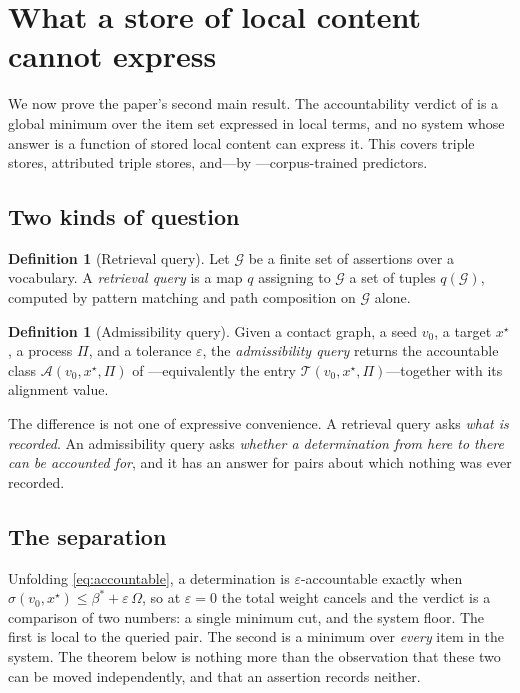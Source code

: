 \documentclass[11pt,twocolumn,a4paper]{article}
\theoremstyle{dirthm}
\theoremstyle{definition}
\newtheorem{definition}[theorem]{Definition}
\theoremstyle{remark}
\newcommand{\flo}{\beta}
\newcommand{\str}{\sigma}
\newcommand{\Om}{\Omega}
\newcommand{\Proc}{\Pi}
\newcommand{\Tab}{\mathcal{T}}
\newcommand{\acc}{\mathcal{A}}
\newcommand{\eps}{\varepsilon}
\begin{document}
\section{What a store of local content cannot express}
\label{sec:separation}

We now prove the paper's second main result. The accountability verdict of
 is a global minimum over the item set expressed in
local terms, and no system whose answer is a function of stored local content
can express it. This covers triple stores, attributed triple stores, and---by
---corpus-trained predictors.

\subsection{Two kinds of question}

\begin{definition}[Retrieval query]
\label{def:retrieval}
Let $\mathcal{G}$ be a finite set of assertions over a vocabulary. A
\emph{retrieval query} is a map $q$ assigning to $\mathcal{G}$ a set of
tuples $q(\mathcal{G})$, computed by pattern matching and path composition on
$\mathcal{G}$ alone.
\end{definition}

\begin{definition}[Admissibility query]
\label{def:admissibility}
Given a contact graph, a seed $v_0$, a target $x^{\star}$, a process $\Proc$,
and a tolerance $\eps$, the \emph{admissibility query} returns the accountable
class $\acc(v_0,x^{\star},\Proc)$ of ---equivalently the
entry $\Tab(v_0,x^{\star},\Proc)$---together with its alignment value.
\end{definition}

The difference is not one of expressive convenience. A retrieval query asks
\emph{what is recorded}. An admissibility query asks \emph{whether a
determination from here to there can be accounted for}, and it has an answer
for pairs about which nothing was ever recorded.

\subsection{The separation}

Unfolding \eqref{eq:accountable}, a determination is $\eps$-accountable
exactly when $\str(v_0,x^{\star})\le\flo^{\ast}+\eps\,\Om$, so at $\eps=0$ the
total weight cancels and the verdict is a comparison of two numbers: a single
minimum cut, and the system floor. The first is local to the queried pair. The
second is a minimum over \emph{every} item in the system. The theorem below is
nothing more than the observation that these two can be moved independently,
and that an assertion records neither.
\end{document}
